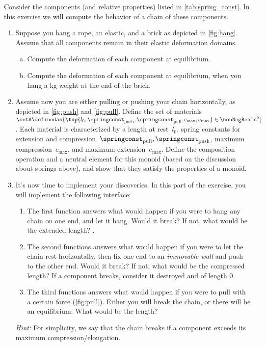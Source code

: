 \begin{gradedexercise}
  Consider the components (and relative properties) listed in \cref{tab:spring_const}.
  In this exercise we will compute the behavior of a chain of these components.
  \begin{enumerate}
    \item Suppose you hang a rope, an elastic, and a brick as depicted in \cref{fig:hang}. Assume that all components remain in their elastic deformation domains.
    \begin{enumerate}[(a)]
    \item Compute the deformation of each component at equilibrium.
    \item Compute the deformation of each component at equilibrium, when you hang a \unit[1]{kg} weight at the end of the brick.
\end{enumerate}
    \item Assume now you are either pulling or pushing your chain horizontally, as depicted in \cref{fig:push} and \cref{fig:pull}.
    Define the set of materials~$\setA\definedas \{ \tup{l_0, \springconst_\mathrm{push},\springconst_\mathrm{pull}, c_\mathrm{max}, e_\mathrm{max}} \in \nonNegReals^5\}$.
Each material is characterized by a length at rest~$l_0$, spring constants for extension and compression~$\springconst_\mathrm{pull}, \springconst_\mathrm{push}$, maximum compression~$c_\mathrm{max}$, and maximum extension~$e_\mathrm{max}$.
    Define the composition operation and a neutral element for this monoid (based on the discussion about springs above), and show that they satisfy the properties of a monoid.
    \item It's now time to implement your discoveries. In this part of the exercise, you will implement the following interface:
    \begin{enumerate}
      \item The first function answers what would happen if you were to hang any chain on one end, and let it hang. Would it break? If not, what would be the extended length? .
      \item The second functions answers what would happen if you were to let the chain rest horizontally, then fix one end to an \emph{immovable wall} and push to the other end. Would it break? If not, what would be the compressed length?
    If a component breaks, consider it destroyed and of length 0.
    \item The third functions answers what would happen if you were to pull with a certain force (\cref{fig:pull}). Either you will break the chain, or there will be an equilibrium. What would be the length?
    \end{enumerate}
    \emph{Hint:} For simplicity, we say that the chain breaks if a component exceeds its maximum compression/elongation.
  \end{enumerate}
\end{gradedexercise}

